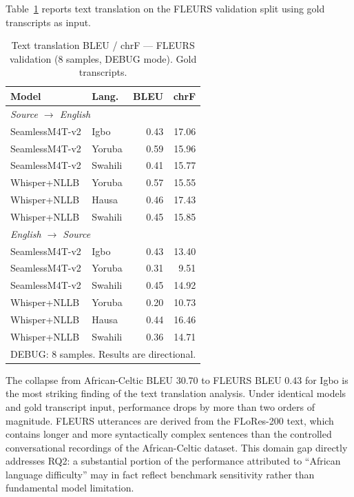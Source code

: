 \documentclass[10pt,twocolumn]{article}
\begin{document}
Table~\ref{tab:fleurs_text} reports text translation on the FLEURS
validation split using gold transcripts as input.

\begin{table}[H]
\centering
\caption{Text translation BLEU / chrF --- FLEURS validation
(8 samples, DEBUG mode). Gold transcripts.}
\label{tab:fleurs_text}
\small
\setlength{\tabcolsep}{3pt}
\begin{tabular}{llrr}
\toprule
\textbf{Model} & \textbf{Lang.} & \textbf{BLEU} & \textbf{chrF} \\
\midrule
\multicolumn{4}{l}{\textit{Source $\rightarrow$ English}} \\
SeamlessM4T-v2 & Igbo    & 0.43 & 17.06 \\
SeamlessM4T-v2 & Yoruba  & 0.59 & 15.96 \\
SeamlessM4T-v2 & Swahili & 0.41 & 15.77 \\
Whisper+NLLB   & Yoruba  & 0.57 & 15.55 \\
Whisper+NLLB   & Hausa   & 0.46 & 17.43 \\
Whisper+NLLB   & Swahili & 0.45 & 15.85 \\
\midrule
\multicolumn{4}{l}{\textit{English $\rightarrow$ Source}} \\
SeamlessM4T-v2 & Igbo    & 0.43 & 13.40 \\
SeamlessM4T-v2 & Yoruba  & 0.31 &  9.51 \\
SeamlessM4T-v2 & Swahili & 0.45 & 14.92 \\
Whisper+NLLB   & Yoruba  & 0.20 & 10.73 \\
Whisper+NLLB   & Hausa   & 0.44 & 16.46 \\
Whisper+NLLB   & Swahili & 0.36 & 14.71 \\
\bottomrule
\multicolumn{4}{l}{\footnotesize DEBUG: 8 samples. Results are directional.}
\end{tabular}
\end{table}

The collapse from African-Celtic BLEU 30.70 to FLEURS BLEU 0.43
for Igbo is the most striking finding of the text translation
analysis.
Under identical models and gold transcript input, performance
drops by more than two orders of magnitude.
FLEURS utterances are derived from the FLoRes-200 text, which
contains longer and more syntactically complex sentences than
the controlled conversational recordings of the African-Celtic
dataset.
This domain gap directly addresses RQ2: a substantial portion
of the performance attributed to ``African language difficulty''
may in fact reflect benchmark sensitivity rather than fundamental
model limitation.
\end{document}
